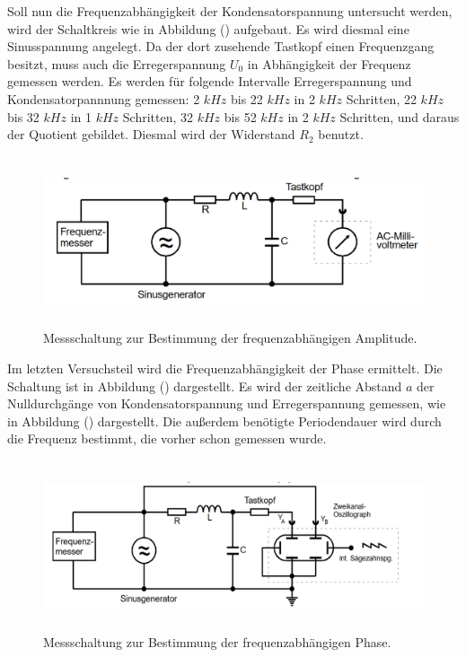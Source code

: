 \noindent Soll nun die Frequenzabhängigkeit der Kondensatorspannung untersucht werden, wird der Schaltkreis wie in Abbildung () aufgebaut.
Es wird diesmal eine Sinusspannung angelegt. Da der dort zusehende Tastkopf einen Frequenzgang besitzt, muss auch die Erregerspannung $U_0$ in Abhängigkeit der Frequenz gemessen werden.
Es werden für folgende Intervalle Erregerspannung und Kondensatorpannnung gemessen: 2 $kHz$ bis 22 $kHz$ in 2 $kHz$ Schritten, 22 $kHz$ bis 32 $kHz$ in 1 $kHz$ Schritten,
32 $kHz$ bis 52 $kHz$ in 2 $kHz$ Schritten, und daraus der Quotient gebildet. Diesmal wird der Widerstand  $R_2$ benutzt.
\begin{figure}[H]
  \centering
  \includegraphics[height=5cm]{Schaltung3.png}
  \caption{Messschaltung zur Bestimmung der frequenzabhängigen Amplitude. \cite[S. 13]{kent}}
\end{figure}


\noindent Im letzten Versuchsteil wird die Frequenzabhängigkeit der Phase ermittelt. Die Schaltung ist in Abbildung () dargestellt.
Es wird der zeitliche Abstand $a$ der Nulldurchgänge von Kondensatorspannung und Erregerspannung gemessen, wie in Abbildung () dargestellt.
Die außerdem benötigte Periodendauer wird durch die Frequenz bestimmt, die vorher schon gemessen wurde.
\begin{figure}[H]
  \centering
  \includegraphics[height=5cm]{Schaltung4.png}
  \caption{Messschaltung zur Bestimmung der frequenzabhängigen Phase. \cite[S. 13]{kent}}
\end{figure}


